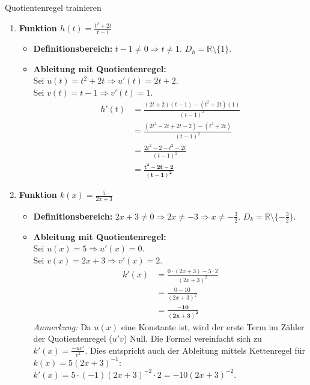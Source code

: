\begin{loesungsumgebung}{Quotientenregel trainieren}
\begin{enumerate}[label=(\alph*)]
    \item \textbf{Funktion $h(t) = \frac{t^2+2t}{t-1}$}
    \begin{itemize}
        \item \textbf{Definitionsbereich:} $t-1 \neq 0 \Rightarrow t \neq 1$. $D_h = \mathbb{R} \setminus \{1\}$.
        \item \textbf{Ableitung mit Quotientenregel:} \\
        Sei $u(t) = t^2+2t \Rightarrow u'(t) = 2t+2$. \\
        Sei $v(t) = t-1 \Rightarrow v'(t) = 1$.
        \begin{align*}
        h'(t) &= \frac{(2t+2)(t-1) - (t^2+2t)(1)}{(t-1)^2} \\
              &= \frac{(2t^2 - 2t + 2t - 2) - (t^2+2t)}{(t-1)^2} \\
              &= \frac{2t^2 - 2 - t^2 - 2t}{(t-1)^2} \\
              &= \mathbf{\frac{t^2 - 2t - 2}{(t-1)^2}}
        \end{align*}
    \end{itemize}

    \item \textbf{Funktion $k(x) = \frac{5}{2x+3}$}
    \begin{itemize}
        \item \textbf{Definitionsbereich:} $2x+3 \neq 0 \Rightarrow 2x \neq -3 \Rightarrow x \neq -\frac{3}{2}$. $D_k = \mathbb{R} \setminus \{-\frac{3}{2}\}$.
        \item \textbf{Ableitung mit Quotientenregel:} \\
        Sei $u(x) = 5 \Rightarrow u'(x) = 0$. \\
        Sei $v(x) = 2x+3 \Rightarrow v'(x) = 2$.
        \begin{align*}
        k'(x) &= \frac{0 \cdot (2x+3) - 5 \cdot 2}{(2x+3)^2} \\
              &= \frac{0 - 10}{(2x+3)^2} \\
              &= \mathbf{\frac{-10}{(2x+3)^2}}
        \end{align*}
        \textit{Anmerkung:} Da $u(x)$ eine Konstante ist, wird der erste Term im Zähler der Quotientenregel ($u'v$) Null. Die Formel vereinfacht sich zu $k'(x) = \frac{-uv'}{v^2}$. Dies entspricht auch der Ableitung mittels Kettenregel für $k(x) = 5(2x+3)^{-1}$: $k'(x) = 5 \cdot (-1)(2x+3)^{-2} \cdot 2 = -10(2x+3)^{-2}$.
    \end{itemize}
\end{enumerate}

\end{loesungsumgebung}



